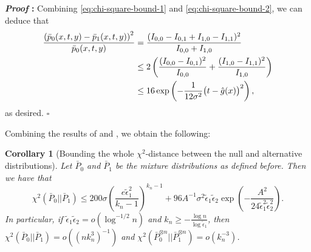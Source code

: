 \documentclass{article}
\def\eps{{\epsilon}}
\newtheorem{corollary}{Corollary}[section]
\renewenvironment{proof}{\noindent\textbf{\textit{Proof }:}}{\hfill$\square$}
\begin{document}
\begin{proof}
    Combining \eqref{eq:chi-square-bound-1} and \eqref{eq:chi-square-bound-2}, we can deduce that
    \begin{equation}
        \notag
        \begin{aligned}
            \frac{\left(\bar{p}_0(x,t,y)-\bar{p}_1(x,t,y)\right)^2}{\bar{p}_0(x,t,y)} &= \frac{(I_{0,0}-I_{0,1}+I_{1,0}-I_{1,1})^2}{I_{0,0}+I_{1,0}} \\
            &\leq 2 \left( \frac{(I_{0,0}-I_{0,1})^2}{I_{0,0}} + \frac{(I_{1,0}-I_{1,1})^2}{I_{1,0}} \right) \\
            &\leq 16\exp\left(-\frac{1}{12\sigma^2}\big(t-\hat{g}(x)\big)^2\right),
        \end{aligned}
    \end{equation}
    as desired.
\end{proof}

Combining the results of  and , we obtain the following:

\begin{corollary}[Bounding the whole $\chi^2$-distance between the null and alternative distributions]
    \label{cor:chi-square-combined}
    Let $\bar{P}_0$ and $\bar{P}_1$ be the mixture distributions as defined before. Then we have that
    \begin{equation}
        \label{eq:chi-square-combined}
        \chi^2(\bar{P}_0||\bar{P}_1) \leq 200\sigma\left(\frac{e\tilde{\eps}_1^2}{k_n-1}\right)^{k_n-1} + 96A^{-1}\sigma^2\tilde{\eps}_1\tilde{\eps}_2\exp\left(-\frac{A^2}{24\tilde{\eps}_1^2\tilde{\eps}_2^2}\right).
    \end{equation}
    In particular, if $\tilde{\eps}_1\tilde{\eps}_2 = o\left(\log^{-1/2}n\right)$ and $k_n \geq -\frac{\log n}{\log \tilde{\eps}_1}$, then $\chi^2(\bar{P}_0||\bar{P}_1) = o\left((nk_n^3)^{-1}\right)$ and $\chi^2\left(\bar{P}_0^{\otimes n} || \bar{P}_1^{\otimes n}\right) = o\left(k_n^{-3}\right)$.
\end{corollary}
\end{document}
